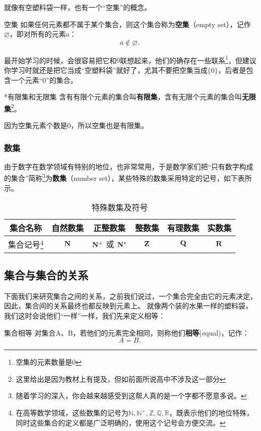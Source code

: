 就像有空塑料袋一样，也有一个“空集”的概念。

\begin{definition}{空集}
如果任何元素都不属于某个集合，则这个集合称为\textbf{空集}（empty set），记作 $\varnothing$，即对所有的元素$a$：
\begin{equation}
a\notin\varnothing.~
\end{equation}
\end{definition}

最开始学习的时候，会很容易把它和$0$联想起来，他们的确存在一些联系\footnote{空集的元素数量是0}，但建议你学习时就还是把它当成“空塑料袋”就好了，尤其不要把空集当成$\{0\}$，后者是包含一个元素“$0$”的集合。

\begin{definition}{*有限集和无限集}
含有有限个元素的集合叫\textbf{有限集}，含有无限个元素的集合叫\textbf{无限集}\footnote{这里给出是因为教材上有提及，但如前面所说高中不涉及这一部分}。
\end{definition}

因为空集元素个数是0，所以空集也是有限集。


\subsubsection{数集}

由于数字在数学领域有特别的地位，也非常常用，于是数学家们把“只有数字构成的集合”简称\footnote{随着学习的深入，你会越来越感受到这帮人真的是一个字都不愿意多说。}为\textbf{数集}（number set），某些特殊的数集采用特定的记号，如下表所示。

\begin{table}[ht]
\centering
\caption{特殊数集及符号}\label{tab_HsSet2}
\begin{tabular}{|c|c|c|c|c|c|}
\hline
集合名称 &自然数集  &正整数集  & 整数集 & 有理数集& 实数集 \\
\hline
集合记号\footnote{在高等数学领域，这些数集的记号为$\mathbb{N,N^+,Z,Q,R}$，既表示他们的地位特殊，同时这些集合的定义都是广泛明确的，使用这个记号会方便交流。} & ${\rm \mathbf{N}}$ & ${\rm \mathbf{N^+}}$ 或 ${\rm \mathbf{N^*}}$ & ${\rm \mathbf{Z}}$ & ${\rm \mathbf{Q}}$ & ${\rm \mathbf{R}}$ \\
\hline
\end{tabular}
\end{table}


\subsection{集合与集合的关系}\label{sub_HsSet_1}
下面我们来研究集合之间的关系，之前我们说过，一个集合完全由它的元素决定，因此，集合间的关系最终也都反映到元素上。
就像两个装的水果一样的塑料袋，我们这时会说他们“一样”一样，我们先来定义相等：
\begin{definition}{集合相等}
对集合A、B，若他们的元素完全相同，则称他们\textbf{相等}(equal)，记作：
\begin{equation}
A=B.~
\end{equation}
\end{definition}

